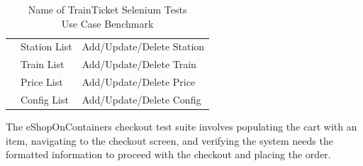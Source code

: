 \begin{table}[h]
\begin{tabular}{|P{1cm}|P{2cm}|P{4.5cm}|}
                        & Station List             & Add/Update/Delete Station\\
                        & Train List               & Add/Update/Delete Train\\
                        & Price List               & Add/Update/Delete Price\\
                        & Config List              & Add/Update/Delete Config\\
\hline
\end{tabular}
\caption{Name of TrainTicket Selenium Tests\\Use Case Benchmark}
\label{tab:selenium-trainticket-test-name-new}
\vspace{-1em}
\end{table}

The eShopOnContainers checkout test suite involves populating the cart with an item, navigating to the checkout screen, and verifying the system needs the formatted information to proceed with the checkout and placing the order.

